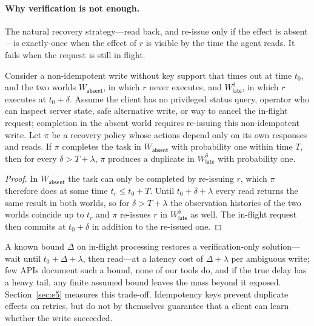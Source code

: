 

\paragraph{Why verification is not enough.} The natural recovery strategy---read back, and re-issue only if
the effect is absent---is exactly-once when the effect of $r$ is visible by the time the agent reads.
It fails when the request is still in flight.

\begin{proposition}
\label{prop:late}
Consider a non-idempotent write without key support that times out at time $t_0$, and the two worlds
$W_{\textsf{absent}}$, in which $r$ never executes, and $W_{\textsf{late}}^{\delta}$, in which $r$ executes at
$t_0+\delta$. Assume the client has no privileged status query, operator who can inspect server state, safe
alternative write, or way to cancel the in-flight request; completion in the absent world requires re-issuing
this non-idempotent write. Let $\pi$ be a recovery policy whose actions depend only on its own responses and
reads. If $\pi$ completes
the task in $W_{\textsf{absent}}$ with probability one within time $T$, then for every
$\delta > T + \lambda$, $\pi$ produces a duplicate in $W_{\textsf{late}}^{\delta}$ with probability one.
\end{proposition}

\begin{proof}
In $W_{\textsf{absent}}$ the task can only be completed by re-issuing $r$, which $\pi$ therefore does at
some time $t_r \le t_0 + T$. Until $t_0+\delta+\lambda$ every read returns the same result in both worlds, so
for $\delta > T+\lambda$ the observation histories of the two worlds coincide up to $t_r$ and $\pi$ re-issues
$r$ in $W_{\textsf{late}}^{\delta}$ as well. The in-flight request then commits at $t_0+\delta$ in addition to
the re-issued one.
\end{proof}

A known bound $\Delta$ on in-flight processing restores a verification-only solution---wait until
$t_0+\Delta+\lambda$, then read---at a latency cost of $\Delta+\lambda$ per ambiguous write; few APIs document such
a bound, none of our tools do, and if the true delay has a heavy tail, any finite assumed bound leaves the mass
beyond it exposed. Section~\ref{sec:e5} measures this trade-off. Idempotency keys prevent duplicate effects on
retries, but do not by themselves guarantee that a client can learn whether the write succeeded.

